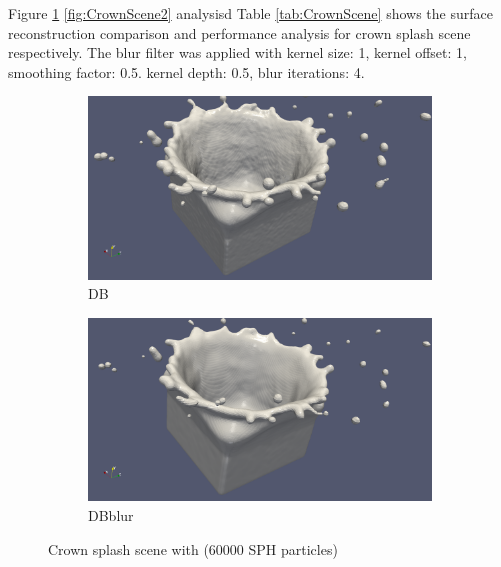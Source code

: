 Figure \ref{fig:CrownScene1} \ref{fig:CrownScene2} analysisd Table \ref{tab:CrownScene} shows the surface reconstruction comparison  and performance analysis for crown splash scene respectively. The blur filter was applied with kernel size: 1, kernel offset: 1, smoothing factor: 0.5. kernel depth: 0.5, blur iterations: 4.
\begin{figure}
	\begin{center}
        \begin{subfigure}[b]{\textwidth}
               \includegraphics[width=\textwidth]{figures/CrownOriginal.png}
				\caption{DB}
        \end{subfigure}
        \begin{subfigure}[b]{\textwidth}
               \includegraphics[width=\textwidth]{figures/CrownBlurred.png}
				\caption{DBblur}
        \end{subfigure}
	\end{center}
    \caption{Crown splash scene with (60000 SPH particles)}
    \label{fig:CrownScene1}
\end{figure}
